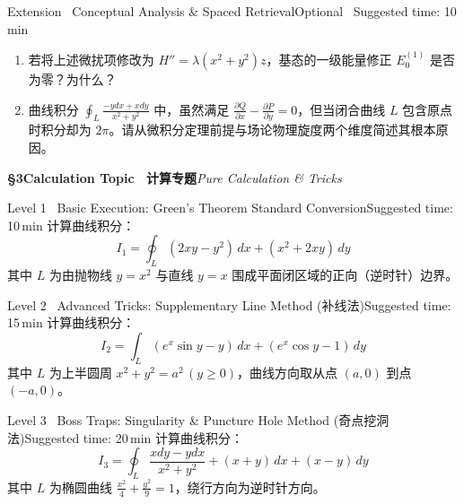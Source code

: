 \documentclass[a4paper,11pt]{article}
\begin{document}
\vspace{6pt}

\begin{problem}{Extension \textbar\ Conceptual Analysis \& Spaced Retrieval}{Optional \textperiodcentered\ Suggested time: 10\,min}
\begin{enumerate}[leftmargin=1.8em, itemsep=2pt, topsep=1pt]
  \item 若将上述微扰项修改为 $H'' = \lambda (x^2 + y^2) z$，基态的一级能量修正 $E_0^{(1)}$ 是否为零？为什么？
  \item 曲线积分 $\oint_L \frac{-y dx + x dy}{x^2+y^2}$ 中，虽然满足 $\frac{\partial Q}{\partial x} - \frac{\partial P}{\partial y} = 0$，但当闭合曲线 $L$ 包含原点时积分却为 $2\pi$。请从微积分定理前提与场论物理旋度两个维度简述其根本原因。
\end{enumerate}
\end{problem}

\clearpage

{\Large\sffamily\bfseries\color{navy} \S 3\quad Calculation Topic \textbar\ 计算专题}\hfill{\small\sffamily\color{mist}\itshape Pure Calculation \& Tricks}

\vspace{8pt}

\begin{problem}{Level 1 \textbar\ Basic Execution: Green's Theorem Standard Conversion}{Suggested time: 10\,min}
计算曲线积分：
\[
  I_1 = \oint_L (2xy - y^2)\,dx + (x^2 + 2xy)\,dy
\]
其中 $L$ 为由抛物线 $y = x^2$ 与直线 $y = x$ 围成平面闭区域的正向（逆时针）边界。
\end{problem}

\vspace{6pt}

\begin{problem}{Level 2 \textbar\ Advanced Tricks: Supplementary Line Method (补线法)}{Suggested time: 15\,min}
计算曲线积分：
\[
  I_2 = \int_L (e^x \sin y - y)\,dx + (e^x \cos y - 1)\,dy
\]
其中 $L$ 为上半圆周 $x^2 + y^2 = a^2 \, (y \ge 0)$，曲线方向取从点 $(a, 0)$ 到点 $(-a, 0)$。
\end{problem}

\vspace{6pt}

\begin{problem}{Level 3 \textbar\ Boss Traps: Singularity \& Puncture Hole Method (奇点挖洞法)}{Suggested time: 20\,min}
计算曲线积分：
\[
  I_3 = \oint_L \frac{x dy - y dx}{x^2 + y^2} + (x+y)\,dx + (x-y)\,dy
\]
其中 $L$ 为椭圆曲线 $\frac{x^2}{4} + \frac{y^2}{9} = 1$，绕行方向为逆时针方向。
\end{problem}
\end{document}
